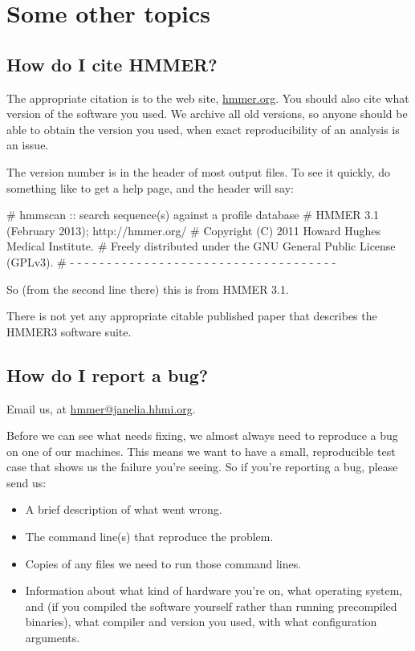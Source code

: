 
\section{Some other topics}
\label{section:more}
\setcounter{footnote}{0}

\subsection{How do I cite HMMER?}

The appropriate citation is to the web site, \url{hmmer.org}. You
should also cite what version of the software you used. We archive all
old versions, so anyone should be able to obtain the version you used,
when exact reproducibility of an analysis is an issue. 

The version number is in the header of most output files. To see it
quickly, do something like  to get a help page, and
the header will say:

\begin{sreoutput}
# hmmscan :: search sequence(s) against a profile database
# HMMER 3.1 (February 2013); http://hmmer.org/
# Copyright (C) 2011 Howard Hughes Medical Institute.
# Freely distributed under the GNU General Public License (GPLv3).
# - - - - - - - - - - - - - - - - - - - - - - - - - - - - - - - - - - - -
\end{sreoutput}

So (from the second line there) this is from HMMER 3.1.

There is not yet any appropriate citable published paper that
describes the HMMER3 software suite.



\subsection{How do I report a bug?}

Email us, at \url{hmmer@janelia.hhmi.org}.

Before we can see what needs fixing, we almost always need to
reproduce a bug on one of our machines. This means we want to have a
small, reproducible test case that shows us the failure you're seeing.
So if you're reporting a bug, please send us:

\begin{itemize}
 \item A brief description of what went wrong.
 \item The command line(s) that reproduce the problem.
 \item Copies of any files we need to run those command lines.
 \item Information about what kind of hardware you're on, what
   operating system, and (if you compiled the software yourself rather
   than running precompiled binaries), what compiler and version you
   used, with what configuration arguments.
\end{itemize}

